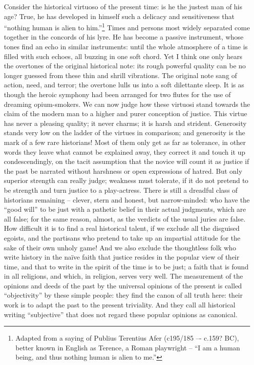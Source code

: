 Consider the historical virtuoso of the present time: is he the
justest man of his age? True, he has developed in himself such a
delicacy and sensitiveness that \enquote{nothing human is alien to him.}\footnote{Adapted from a saying of Publius Terentius Afer (c195/185 –- c.159? BC), better known in English as Terence, a Roman playwright -- \enquote{I am a human being, and thus nothing human is alien to me.} }
Times and persons most widely separated come together in the concords
of his lyre. He has become a passive instrument, whose tones find an
echo in similar instruments: until the whole atmosphere of a time is
filled with such echoes, all buzzing in one soft chord. Yet I think
one only hears the overtones of the original historical note: its
rough powerful quality can be no longer guessed from these thin and
shrill vibrations. The original note sang of action, need, and
terror; the overtone lulls us into a soft dilettante sleep. It is as
though the heroic symphony had been arranged for two flutes for the
use of dreaming opium-smokers. We can now judge how these virtuosi
stand towards the claim of the modern man to a higher and purer
conception of justice. This virtue has never a pleasing quality; it
never charms; it is harsh and strident. Generosity stands very low on
the ladder of the virtues in comparison; and generosity is the mark
of a few rare historians! Most of them only get as far as tolerance,
in other words they leave what cannot be explained away, they correct
it and touch it up condescendingly, on the tacit assumption that the
novice will count it as justice if the past be narrated without
harshness or open expressions of hatred. But only superior strength
can really judge; weakness must tolerate, if it do not pretend to be
strength and turn justice to a play-actress. There is still a
dreadful class of historians remaining -- clever, stern and honest, but
narrow-minded: who have the \enquote{good will} to be just with a pathetic
belief in their actual judgments, which are all false; for the same
reason, almost, as the verdicts of the usual juries are false. How
difficult it is to find a real historical talent, if we exclude all
the disguised egoists, and the partisans who pretend to take up an
impartial attitude for the sake of their own unholy game! And we also
exclude the thoughtless folk who write history in the naïve faith
that justice resides in the popular view of their time, and that to
write in the spirit of the time is to be just; a faith that is found
in all religions, and which, in religion, serves very well. The
measurement of the opinions and deeds of the past by the universal
opinions of the present is called \enquote{objectivity} by these simple
people: they find the canon of all truth here: their work is to adapt
the past to the present triviality. And they call all historical
writing \enquote{subjective} that does not regard these popular opinions as
canonical.

